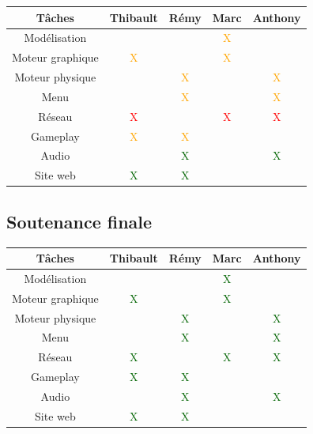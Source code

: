 \documentclass[a4paper, 11pt]{report}
\begin{document}
\begin{tabular}{ | c || c | c | c | c | }
\hline Tâches & Thibault & Rémy & Marc & Anthony \\
\hline Modélisation & & & \textcolor{orange}{X} & \\
\hline Moteur graphique & \textcolor{orange}{X} & & \textcolor{orange}{X} & \\
\hline Moteur physique & & \textcolor{orange}{X} & & \textcolor{orange}{X} \\
\hline Menu & & \textcolor{orange}{X} & & \textcolor{orange}{X} \\
\hline Réseau & \textcolor{red}{X} & & \textcolor{red}{X} & \textcolor{red}{X} \\
\hline Gameplay & \textcolor{orange}{X} & \textcolor{orange}{X} & & \\
\hline Audio & & \textcolor{darkgreen}{X} & & \textcolor{darkgreen}{X} \\
\hline Site web & \textcolor{darkgreen}{X} & \textcolor{darkgreen}{X} & & \\
\hline
\end{tabular}

\subsection{Soutenance finale}\label{soutenance-finale}

\begin{tabular}{ | c || c | c | c | c | }
\hline Tâches & Thibault & Rémy & Marc & Anthony \\
\hline Modélisation & & & \textcolor{darkgreen}{X} & \\
\hline Moteur graphique & \textcolor{darkgreen}{X} & & \textcolor{darkgreen}{X} & \\
\hline Moteur physique & & \textcolor{darkgreen}{X} & & \textcolor{darkgreen}{X} \\
\hline Menu & & \textcolor{darkgreen}{X} & & \textcolor{darkgreen}{X} \\
\hline Réseau & \textcolor{darkgreen}{X} & & \textcolor{darkgreen}{X} & \textcolor{darkgreen}{X} \\
\hline Gameplay & \textcolor{darkgreen}{X} & \textcolor{darkgreen}{X} & & \\
\hline Audio & & \textcolor{darkgreen}{X} & & \textcolor{darkgreen}{X} \\
\hline Site web & \textcolor{darkgreen}{X} & \textcolor{darkgreen}{X} & & \\
\hline
\end{tabular}
\end{document}
